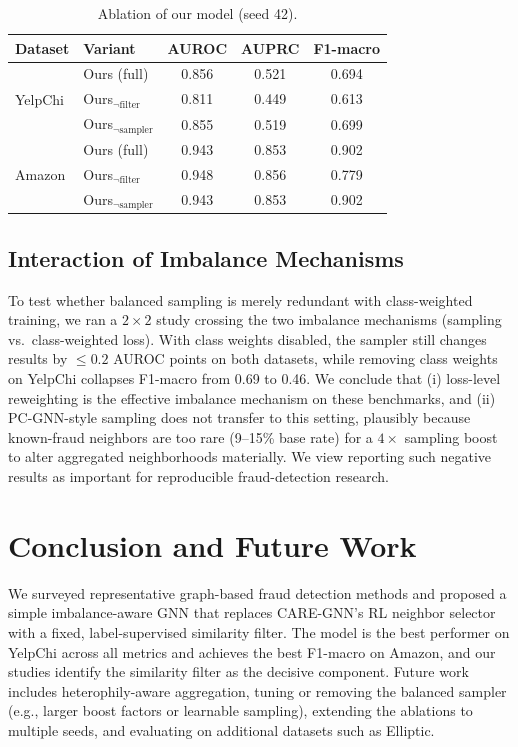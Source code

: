 \documentclass[conference]{IEEEtran}
\begin{document}
\begin{table}[t]
\centering
\caption{Ablation of our model (seed 42).}
\label{tab:ablation}
\begin{tabular}{llccc}
\hline
\textbf{Dataset} & \textbf{Variant} & \textbf{AUROC} & \textbf{AUPRC} & \textbf{F1-macro} \\
\hline
\multirow{3}{*}{YelpChi}
 & Ours (full)              & 0.856 & 0.521 & 0.694 \\
 & Ours$_{\neg\text{filter}}$  & 0.811 & 0.449 & 0.613 \\
 & Ours$_{\neg\text{sampler}}$ & 0.855 & 0.519 & 0.699 \\
\hline
\multirow{3}{*}{Amazon}
 & Ours (full)              & 0.943 & 0.853 & 0.902 \\
 & Ours$_{\neg\text{filter}}$  & 0.948 & 0.856 & 0.779 \\
 & Ours$_{\neg\text{sampler}}$ & 0.943 & 0.853 & 0.902 \\
\hline
\end{tabular}
\end{table}

\subsection{Interaction of Imbalance Mechanisms}
To test whether balanced sampling is merely redundant with class-weighted
training, we ran a $2 \times 2$ study crossing the two imbalance mechanisms
(sampling vs.\ class-weighted loss). With class weights disabled, the
sampler still changes results by $\leq 0.2$ AUROC points on both datasets,
while removing class weights on YelpChi collapses F1-macro from 0.69 to 0.46.
We conclude that (i) loss-level reweighting is the effective imbalance
mechanism on these benchmarks, and (ii) PC-GNN-style sampling does not
transfer to this setting, plausibly because known-fraud neighbors are too
rare (9--15\% base rate) for a $4\times$ sampling boost to alter aggregated
neighborhoods materially. We view reporting such negative results as
important for reproducible fraud-detection research.

\section{Conclusion and Future Work}
We surveyed representative graph-based fraud detection methods and proposed
a simple imbalance-aware GNN that replaces CARE-GNN's RL neighbor selector
with a fixed, label-supervised similarity filter. The model is the best
performer on YelpChi across all metrics and achieves the best F1-macro on
Amazon, and our studies identify the similarity filter as the decisive
component. Future work includes heterophily-aware aggregation, tuning or
removing the balanced sampler (e.g., larger boost factors or learnable
sampling), extending the ablations to multiple seeds, and evaluating on
additional datasets such as Elliptic.



\end{document}
